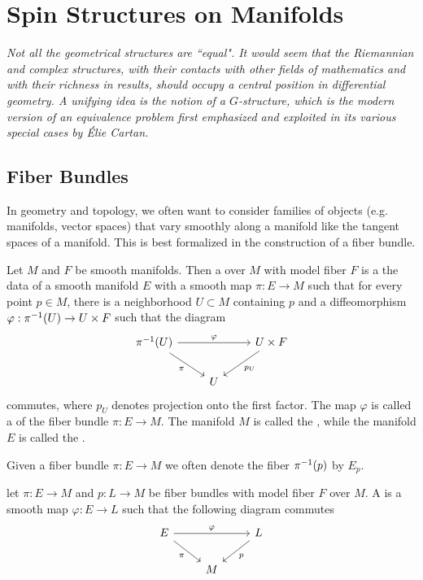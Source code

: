\chapter{Spin Structures on Manifolds}
%
\subsectionend $ $\\
%
\emph{Not all the geometrical structures are ``equal". It would seem that the
 Riemannian and complex structures, with their contacts with other fields of
 mathematics and with their richness in results, should occupy a central position
 in differential geometry. A unifying idea is the notion of a $G$-structure, which
 is the modern version of an equivalence problem first emphasized and exploited
 in its various special cases by \'Elie Cartan.} \\
%
%
\subsectionend
%
\section{Fiber Bundles}
%
In geometry and topology, we often want to consider families of objects
(e.g. manifolds, vector spaces) that vary smoothly along a manifold like
the tangent spaces of a manifold. This is best formalized in the construction
of a fiber bundle.
%
\begin{defn}
Let $M$ and $F$ be smooth manifolds. Then a  over $M$ with
model fiber $F$ is a the data of a smooth manifold $E$ with a smooth map
$\pi : E \to M$ such that for every point $p \in M$, there is a neighborhood
$U \subset M$ containing $p$ and a diffeomorphism
$\varphi : \pi^{-1}(U) \to U \times F$ such that the diagram
\[\begin{tikzcd}
\pi\inv(U) \ar[rr, "\varphi"] \ar[dr, "\pi"']&& U \times F \ar[dl, "p_U"] \\
& U
\end{tikzcd}\]
commutes, where $p_U$ denotes projection onto the first factor. The map $\varphi$ is
called a  of the fiber bundle $\pi : E \to M$. The
manifold $M$ is called the , while the manifold $E$ is
called the .
\end{defn}
%
Given a fiber bundle $\pi : E \to M$ we often denote the fiber $\pi^{-1}(p)$
by $E_p$.
%
\begin{defn}
let $\pi : E \to M$ and $p : L \to M$ be fiber bundles with model fiber $F$
over $M$. A  is a smooth map $\varphi : E \to L$ such
that the following diagram commutes
\[\begin{tikzcd}
E \ar[dr, "\pi"']\ar[rr,"\varphi"] & & L \ar[dl, "p"] \\
& M
\end{tikzcd}\]
\end{defn}

